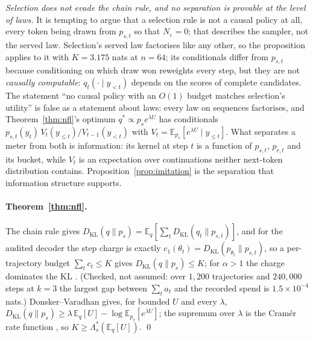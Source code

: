 \emph{Selection does not evade the chain rule, and no separation is provable at the level of laws.}\label{app:noseparation}
It is tempting to argue that a selection rule is not a causal policy at all, every token being drawn from $p_{s,t}$ so that $N_\varepsilon = 0$; that describes the sampler, not the served law. Selection's served law factorises like any other, so the proposition applies to it with $K = 3.175$ nats
at $n=64$; its conditionals differ from $p_{s,t}$ because conditioning on which draw won reweights every
step, but they are not \emph{causally computable}: $q_t(\cdot \mid y_{<t})$ depends on the scores of
complete candidates. The statement ``no causal policy with an $O(1)$ budget matches selection's utility''
is false as a statement about laws: every law on sequences factorises, and Theorem~\ref{thm:nfl}'s
optimum $q^* \propto p_s e^{\lambda U}$ has conditionals $p_{s,t}(y_t)\,V_t(y_{\le t})/V_{t-1}(y_{<t})$ with
$V_t = \mathbb{E}_{p_s}[e^{\lambda U} \mid y_{\le t}]$. What separates a meter from both is information: its
kernel at step $t$ is a function of $p_{s,t}$, $p_{r,t}$ and its bucket, while $V_t$ is an expectation over
continuations neither next-token distribution contains. Proposition~\ref{prop:imitation} is the
separation that information structure supports.

\paragraph{Theorem~\ref{thm:nfl}.}
The chain rule gives $D_{\mathrm{KL}}(q \| p_s) = \mathbb{E}_q[\sum_t D_{\mathrm{KL}}(q_t \| p_{s,t})]$, and
for the audited decoder the step charge is exactly $c_1(\theta_t) = D_{\mathrm{KL}}(p_{\theta_t} \| p_{s,t})$,
so a per-trajectory budget $\sum_t c_t \le K$ gives $D_{\mathrm{KL}}(q \| p_s) \le K$; for $\alpha > 1$ the
charge dominates the KL \citep{vanerven2014renyi}. (Checked, not assumed: over $1{,}200$ trajectories and
$240{,}000$ steps at $k=3$ the largest gap between $\sum_t a_t$ and the recorded spend is
$1.5\times10^{-4}$ nats.) Donsker--Varadhan \citep{donsker1975asymptotic} gives, for bounded $U$ and every
$\lambda$, $D_{\mathrm{KL}}(q \| p_s) \ge \lambda\, \mathbb{E}_q[U] - \log \mathbb{E}_{p_s}[e^{\lambda U}]$;
the supremum over $\lambda$ is the Cram\'er rate function \citep{dembo1998large}, so
$K \ge \Lambda^*_s(\mathbb{E}_q[U])$. \qed

